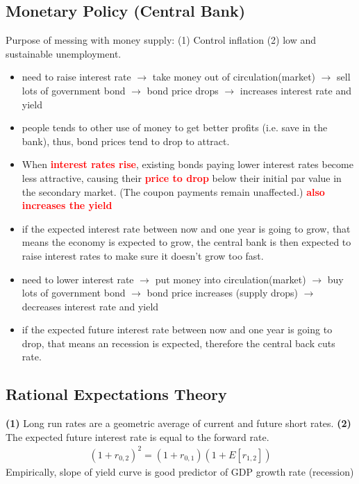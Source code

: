 \begin{multicols}{2}
\vspace*{0.3cm}
\subsection{Monetary Policy (Central Bank)}
Purpose of messing with money supply: (1) Control inflation (2) low and sustainable unemployment. \par
{}
\begin{itemize}
    \item need to raise interest rate $\rightarrow$ take money out of circulation(market) $\rightarrow$ sell lots of government bond $\rightarrow$ bond price drops 
    $\rightarrow$ increases interest rate and yield 
    \item people tends to other use of money to get better profits (i.e. save in the bank), thus, bond prices tend to drop to attract.
    \item When \textcolor{red}{\textbf{interest rates rise}}, existing bonds paying lower interest rates become less attractive, causing their \textcolor{red}{\textbf{price to drop}} below their initial par value in the secondary market. (The coupon payments remain unaffected.) \textcolor{red}{\textbf{also increases the yield}}
    \item if the expected interest rate between now and one year is going to grow, that means the economy is expected to grow, the central bank is then expected to raise interest rates to make sure it doesn't grow too fast.
\end{itemize}
\begin{itemize}
    \item need to lower interest rate $\rightarrow$ put money into circulation(market) $\rightarrow$ buy lots of government bond $\rightarrow$ bond price increases (supply drops) $\rightarrow$ decreases interest rate and yield 
    \item if the expected future interest rate between now and one year is going to drop, that means an recession is expected, therefore the central back cuts rate.  
\end{itemize}

\subsection{Rational Expectations Theory}
\textbf{(1)} Long run rates are a geometric average of current and future short rates. \textbf{(2)} The expected future interest rate is equal to the forward rate.
\begin{gather*}
    (1+r_{0,2})^2 = (1+r_{0,1})(1+E[r_{1,2}])
\end{gather*}
Empirically, slope of yield curve is good predictor of GDP growth rate (recession)


\end{multicols}
